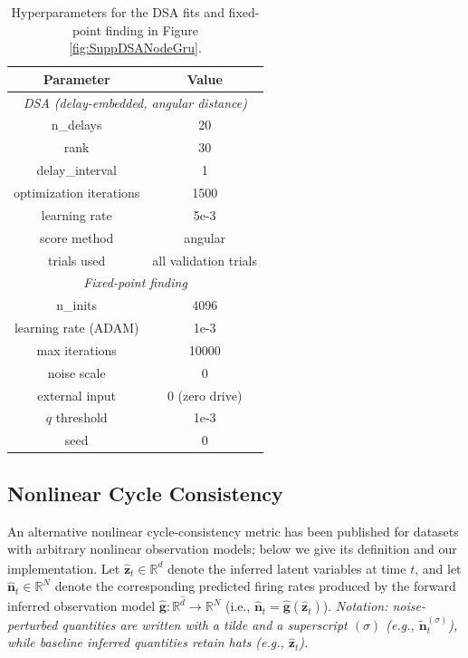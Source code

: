 \documentclass{article}
\begin{document}
\begin{table}[ht]
\centering
\begin{tabular}{|c|c|}
\hline
\textbf{Parameter} & \textbf{Value} \\ \hline
\multicolumn{2}{|c|}{\textit{DSA (delay-embedded, angular distance)}} \\ \hline
n\_delays & 20 \\ \hline
rank & 30 \\ \hline
delay\_interval & 1 \\ \hline
optimization iterations & 1500 \\ \hline
learning rate & 5e-3 \\ \hline
score method & angular \\ \hline
trials used & all validation trials \\ \hline
\multicolumn{2}{|c|}{\textit{Fixed-point finding}} \\ \hline
n\_inits & 4096 \\ \hline
learning rate (ADAM) & 1e-3 \\ \hline
max iterations & 10000 \\ \hline
noise scale & 0 \\ \hline
external input & 0 (zero drive) \\ \hline
$q$ threshold & 1e-3 \\ \hline
seed & 0 \\ \hline
\end{tabular}
\caption{Hyperparameters for the DSA fits and fixed-point finding in Figure \ref{fig:SuppDSANodeGru}.}
\label{table:DSA_FP_params}
\end{table}

\clearpage
\subsection{Nonlinear Cycle Consistency \label{nl_cycle_con}}
An alternative nonlinear cycle-consistency metric \cite{versteeg2023expressive} has been published for datasets with arbitrary nonlinear observation models; below we give its definition and our implementation. Let $\hat{\mathbf{z}}_t \in \mathbb{R}^{\hat{d}}$ denote the inferred latent variables at time $t$, and let $\hat{\mathbf{n}}_t \in \mathbb{R}^N$ denote the corresponding predicted firing rates produced by the forward inferred observation model $\mathbf{\hat{g}}:\mathbb{R}^{\hat{d}} \!\to\! \mathbb{R}^N$ (i.e., $\hat{\mathbf{n}}_t = \mathbf{\hat{g}}(\hat{\mathbf{z}}_t)$).
\emph{Notation: noise-perturbed quantities are written with a tilde and a superscript $(\sigma)$ (e.g., $\tilde{\mathbf{n}}_t^{(\sigma)}$), while baseline inferred quantities retain hats (e.g., $\hat{\mathbf{z}}_t$).}
\end{document}
